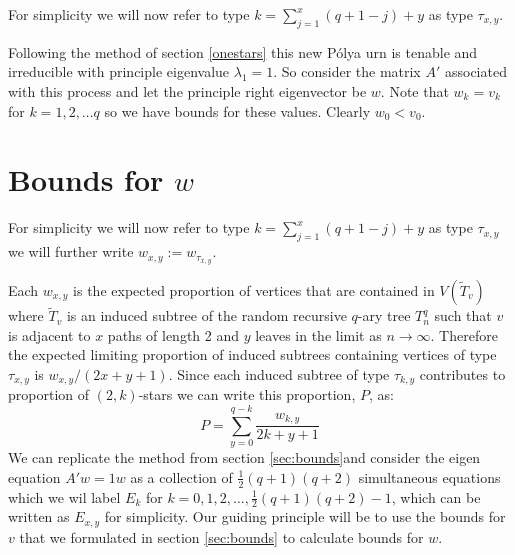 \documentclass[12pt]{article} %
\theoremstyle{definition}
\begin{document}
For simplicity we will now refer to type $k = \sum_{j=1}^{x}(q+ 1 -j) + y$ as type $\tau_{x,y}$.

Following the method of section \ref{onestars} this new P\'{o}lya urn is tenable and irreducible with principle eigenvalue $\lambda_{1} = 1$.  So consider the matrix $A'$ associated with this process and let the principle right eigenvector be $w$.  Note that $w_{k} = v_{k}$ for $k = 1,2,\dots q$ so we have bounds for these values.  Clearly $w_{0} < v_{0}$.   

\section{Bounds for $w$}
For simplicity we will now refer to type $k = \sum_{j=1}^{x}(q+ 1 -j) + y$ as type $\tau_{x,y}$ we will further write $w_{x,y} := w_{\tau_{x,y}}$.  

Each $w_{x,y}$ is the expected proportion of vertices that are contained in $V(\tilde{T}_{v})$ where $\tilde{T}_{v}$ is an induced subtree of the random recursive $q$-ary tree $T_{n}^{q}$ such that $v$ is adjacent to $x$ paths of length 2 and $y$ leaves in the limit as $n \rightarrow\infty$.  Therefore the expected limiting proportion of induced subtrees containing vertices of type $\tau_{x,y}$ is $w_{x,y} / (2x +y + 1)$.  Since each induced subtree of type $\tau_{k,y}$ contributes to proportion of $(2,k)$-stars we can write this proportion, $P$, as:
\[P = \sum_{y=0}^{q-k}\frac{w_{k,y}}{2k + y + 1}\]
We can replicate the method from section \ref{sec:bounds}and consider the eigen equation $A'w = 1w$ as a collection of $\frac{1}{2}(q+1)(q+2)$ simultaneous equations which we wil label $E_{k}$ for $k = 0,1,2,\dots,\frac{1}{2}(q+1)(q+2) - 1$, which can be written as $E_{x,y}$ for simplicity.  Our guiding principle will be to use the bounds for $v$ that we formulated in section \ref{sec:bounds} to calculate bounds for $w$.
 
\end{document}
